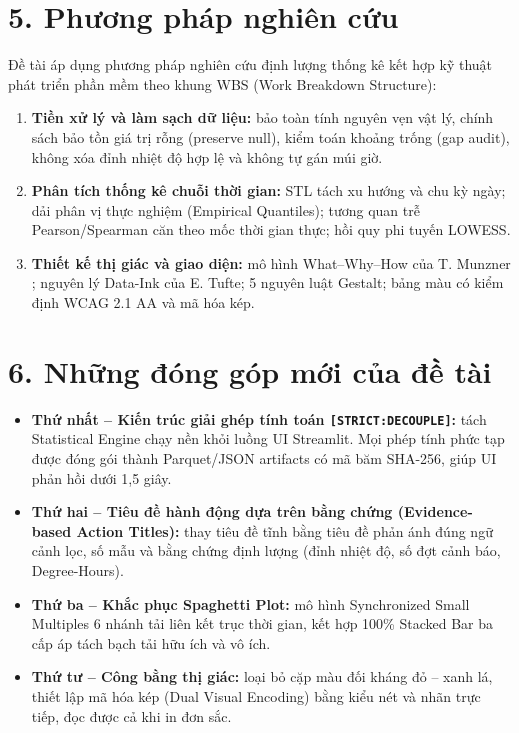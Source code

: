 \documentclass[12pt,a4paper,oneside]{report}
\newcommand{\code}[1]{\texttt{#1}}
\begin{document}
\section*{5. Phương pháp nghiên cứu}

Đề tài áp dụng phương pháp nghiên cứu định lượng thống kê kết hợp kỹ thuật phát triển phần mềm theo khung WBS (Work Breakdown Structure):
\begin{enumerate}
  \item \textbf{Tiền xử lý và làm sạch dữ liệu:} bảo toàn tính nguyên vẹn vật lý, chính sách bảo tồn giá trị rỗng (preserve null), kiểm toán khoảng trống (gap audit), không xóa đỉnh nhiệt độ hợp lệ và không tự gán múi giờ.
  \item \textbf{Phân tích thống kê chuỗi thời gian:} STL tách xu hướng và chu kỳ ngày; dải phân vị thực nghiệm (Empirical Quantiles); tương quan trễ Pearson/Spearman căn theo mốc thời gian thực; hồi quy phi tuyến LOWESS.
  \item \textbf{Thiết kế thị giác và giao diện:} mô hình What--Why--How của T. Munzner \cite{munzner2014}; nguyên lý Data-Ink của E. Tufte; 5 nguyên luật Gestalt; bảng màu có kiểm định WCAG 2.1 AA và mã hóa kép.
\end{enumerate}

\section*{6. Những đóng góp mới của đề tài}

\begin{itemize}
  \item \textbf{Thứ nhất -- Kiến trúc giải ghép tính toán \code{[STRICT:DECOUPLE]}:} tách Statistical Engine chạy nền khỏi luồng UI Streamlit. Mọi phép tính phức tạp được đóng gói thành Parquet/JSON artifacts có mã băm SHA-256, giúp UI phản hồi dưới 1,5 giây.
  \item \textbf{Thứ hai -- Tiêu đề hành động dựa trên bằng chứng (Evidence-based Action Titles):} thay tiêu đề tĩnh bằng tiêu đề phản ánh đúng ngữ cảnh lọc, số mẫu và bằng chứng định lượng (đỉnh nhiệt độ, số đợt cảnh báo, Degree-Hours).
  \item \textbf{Thứ ba -- Khắc phục Spaghetti Plot:} mô hình Synchronized Small Multiples 6 nhánh tải liên kết trục thời gian, kết hợp 100\% Stacked Bar ba cấp áp tách bạch tải hữu ích và vô ích.
  \item \textbf{Thứ tư -- Công bằng thị giác:} loại bỏ cặp màu đối kháng đỏ -- xanh lá, thiết lập mã hóa kép (Dual Visual Encoding) bằng kiểu nét và nhãn trực tiếp, đọc được cả khi in đơn sắc.
\end{itemize}
\end{document}
